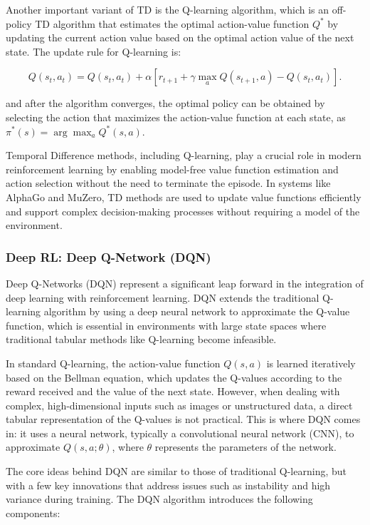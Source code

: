 Another important variant of TD is the Q-learning algorithm, which is an
off-policy TD algorithm that estimates the optimal action-value function $Q^*$
by updating the current action value based on the optimal action value of the
next state. The update rule for Q-learning is:

\begin{equation}
    Q(s_t, a_t) = Q(s_t, a_t) + \alpha[r_{t+1} + \gamma \max_a Q(s_{t+1}, a) - Q(s_t, a_t)] .
\end{equation}

and after the algorithm converges, the optimal policy can be obtained by
selecting the action that maximizes the action-value function at each state, as
$\pi^*(s) = \arg\max_a Q^*(s, a)$.

Temporal Difference methods, including Q-learning, play a crucial role in
modern reinforcement learning by enabling model-free value function estimation
and action selection without the need to terminate the episode. In systems like
AlphaGo and MuZero, TD methods are used to update value functions efficiently
and support complex decision-making processes without requiring a model of the
environment.

\subsubsection{\textbf{Deep RL: Deep Q-Network (DQN)}}

Deep Q-Networks (DQN) represent a significant leap forward in the integration
of deep learning with reinforcement learning. DQN extends the traditional
Q-learning algorithm by using a deep neural network to approximate the Q-value
function, which is essential in environments with large state spaces where
traditional tabular methods like Q-learning become infeasible.

In standard Q-learning, the action-value function \(Q(s, a)\) is learned
iteratively based on the Bellman equation, which updates the Q-values according
to the reward received and the value of the next state. However, when dealing
with complex, high-dimensional inputs such as images or unstructured data, a
direct tabular representation of the Q-values is not practical. This is where
DQN comes in: it uses a neural network, typically a convolutional neural
network (CNN), to approximate \(Q(s, a; \theta)\), where \(\theta\) represents
the parameters of the network.

The core ideas behind DQN are similar to those of traditional Q-learning, but
with a few key innovations that address issues such as instability and high
variance during training. The DQN algorithm introduces the following
components:


